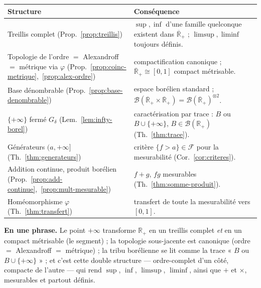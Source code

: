\documentclass[11pt,a4paper]{article}
\theoremstyle{plain}
\theoremstyle{definition}
\newcommand{\Rp}{\mathbb{R}_+}
\newcommand{\Rpb}{\overline{\mathbb{R}}_+}
\newcommand{\B}{\mathcal{B}}
\newcommand{\F}{\mathcal{F}}
\begin{document}
\begin{center}
\renewcommand{\arraystretch}{1.35}
\begin{tabular}{@{}p{5.2cm}p{9.2cm}@{}}
\hline
\textbf{Structure} & \textbf{Conséquence}\\
\hline
Treillis complet (Prop.~\ref{prop:treillis}) &
$\sup,\inf$ d'une famille quelconque existent dans $\Rpb$ ;
$\limsup,\liminf$ toujours définis.\\
Topologie de l'ordre $=$ Alexandroff $=$ métrique via $\varphi$
(Prop.~\ref{prop:coinc-metrique},~\ref{prop:alex-ordre}) &
compactification canonique ; $\Rpb\cong[0,1]$ compact métrisable.\\
Base dénombrable (Prop.~\ref{prop:base-denombrable}) &
espace borélien standard ; $\B(\Rpb\times\Rpb)=\B(\Rpb)^{\otimes2}$.\\
$\{+\infty\}$ fermé $G_\delta$ (Lem.~\ref{lem:infty-borel}) &
caractérisation par trace : $B$ ou $B\cup\{+\infty\}$, $B\in\B(\Rp)$
(Th.~\ref{thm:trace}).\\
Générateurs $(a,+\infty]$ (Th.~\ref{thm:generateurs}) &
critère $\{f>a\}\in\F$ pour la mesurabilité (Cor.~\ref{cor:criteres}).\\
Addition continue, produit borélien
(Prop.~\ref{prop:add-continue},~\ref{prop:mult-mesurable}) &
$f+g$, $fg$ mesurables (Th.~\ref{thm:somme-produit}).\\
Homéomorphisme $\varphi$ (Th.~\ref{thm:transfert}) &
transfert de toute la mesurabilité vers $[0,1]$.\\
\hline
\end{tabular}
\end{center}

\medskip
\noindent
\textbf{En une phrase.} Le point $+\infty$ transforme $\Rp$ en un treillis
complet \emph{et} en un compact métrisable (le segment) ; la topologie
sous-jacente est canonique (ordre $=$ Alexandroff $=$ métrique) ; la tribu
borélienne se lit comme la trace « $B$ ou $B\cup\{+\infty\}$ » ; et c'est cette
double structure — ordre-complet d'un côté, compacte de l'autre — qui rend
$\sup$, $\inf$, $\limsup$, $\liminf$, ainsi que $+$ et $\times$, mesurables et
partout définis.
\end{document}
